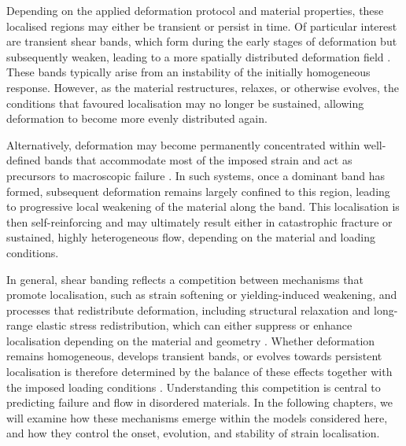 \documentclass[asymmetricmargins]{library/duthesis}%
\begin{document}
Depending on the applied deformation protocol and material properties, these localised regions may either be transient or persist in time. Of particular interest are transient shear bands, which form during the early stages of deformation but subsequently weaken, leading to a more spatially distributed deformation field \cite{moorcroft_age-dependent_2011,barlow_ductile_2020,divouxTransientShearBanding2010,adams_transient_2011}. These bands typically arise from an instability of the initially homogeneous response. However, as the material restructures, relaxes, or otherwise evolves, the conditions that favoured localisation may no longer be sustained, allowing deformation to become more evenly distributed again.

Alternatively, deformation may become permanently concentrated within well-defined bands that accommodate most of the imposed strain and act as precursors to macroscopic failure \cite{greer_shear_2013,hufnagel_deformation_2016,nicolas_deformation_2018,Falk2003,maloney_amorphous_2006,Shi2007,falk_deformation_2011,Barrat2011}. In such systems, once a dominant band has formed, subsequent deformation remains largely confined to this region, leading to progressive local weakening of the material along the band. This localisation is then self-reinforcing and may ultimately result either in catastrophic fracture or sustained, highly heterogeneous flow, depending on the material and loading conditions.

In general, shear banding reflects a competition between mechanisms that promote localisation, such as strain softening or yielding-induced weakening, and processes that redistribute deformation, including structural relaxation and long-range elastic stress redistribution, which can either suppress or enhance localisation depending on the material and geometry \cite{fielding_shear_2014,divouxShearBandingComplex2016,martens_spontaneous_2012,moorcroft_criteria_2013,moorcroft_age-dependent_2011,nicolas_deformation_2018}. Whether deformation remains homogeneous, develops transient bands, or evolves towards persistent localisation is therefore determined by the balance of these effects together with the imposed loading conditions \cite{fielding_shear_2014,divouxShearBandingComplex2016}. Understanding this competition is central to predicting failure and flow in disordered materials. In the following chapters, we will examine how these mechanisms emerge within the models considered here, and how they control the onset, evolution, and stability of strain localisation.
\end{document}
